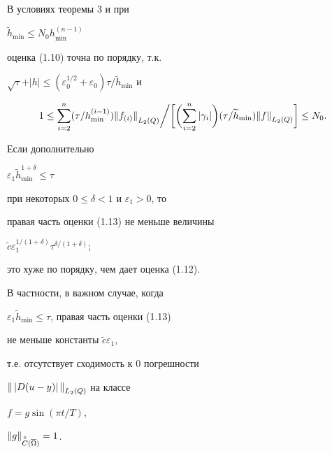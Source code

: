\begin{cor} В условиях теоремы 3 и при 


$\widetilde h_{\min}\le N_0 h^{(n-1)}_{\min}$


оценка (1.10) точна по порядку, т.к. 


$\sqrt\tau+\vert h\vert\le (\varepsilon_0^{1/2}+\varepsilon_0)


\tau/\widetilde h_{\min}$ и


$$


1\le \biggl.


\sum_{i=2}^n(\tau/h_{\min}^{(i-1)}){\ver f_{(i)}\ver}_{L_2(Q)}


\biggr/


\biggl[\biggl(\sum_{i=2}^n\vert\gamma_i\vert\biggr)(\tau/\widetilde h_{\min})


{\ver f\ver}_{L_2(Q)}\biggr]\le N_0.


$$


\end{cor}





\begin{cor} Если дополнительно 


$\varepsilon_1 \widetilde h^{1+\delta}_{\min}\le\tau$ 


при некоторых $0\le \delta<1$ и $\varepsilon_1>0$, то 


правая часть оценки (1.13) не меньше величины


$\widetilde c\varepsilon_1^{1/(1+\delta)}\tau^{\delta/(1+\delta)}$;


это хуже по порядку, чем дает оценка (1.12).


В частности, в важном случае, когда 


$\varepsilon_1 \widetilde h_{\min}\le \tau$, правая часть оценки (1.13)


не меньше константы $\widetilde c\varepsilon_1$,


т.е. отсутствует сходимость к 0 погрешности 


${\|\,\vert D(u-y)\vert\,\|}_{L_2(Q)}$ на классе \linebreak




$f=g\sin(\pi t/T)$, 


${\| g\|}_{\overset{\circ}{C}(\overline\Omega)}=1$.


\end{cor}





